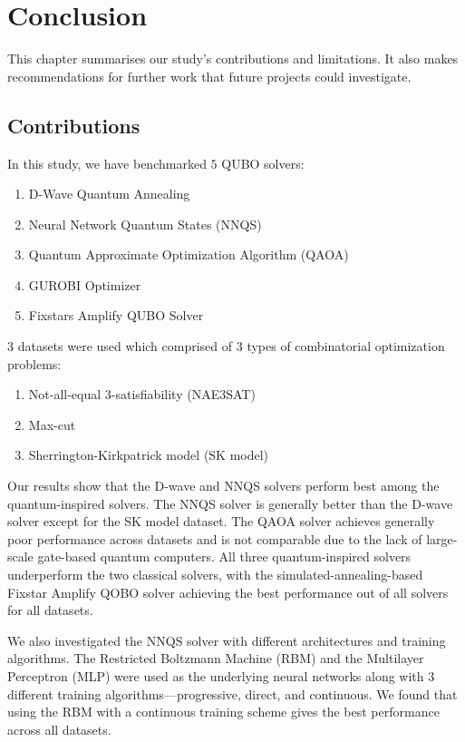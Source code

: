 \chapter{Conclusion}

This chapter summarises our study's contributions and limitations. It also makes recommendations for further work that future projects could investigate.

\section{Contributions}
In this study, we have benchmarked $5$ QUBO solvers:
\begin{enumerate}
    \item D-Wave Quantum Annealing
    \item Neural Network Quantum States (NNQS)
    \item Quantum Approximate Optimization Algorithm (QAOA)
    \item GUROBI Optimizer
    \item Fixstars Amplify QUBO Solver
\end{enumerate}
$3$ datasets were used which comprised of $3$ types of combinatorial optimization problems:
\begin{enumerate}
    \item Not-all-equal 3-satisfiability (NAE3SAT)
    \item Max-cut
    \item Sherrington-Kirkpatrick model (SK model)
\end{enumerate}
Our results show that the D-wave and NNQS solvers perform best among the quantum-inspired solvers. The NNQS solver is generally better than the D-wave solver except for the SK model dataset. The QAOA solver achieves generally poor performance across datasets and is not comparable due to the lack of large-scale gate-based quantum computers. All three quantum-inspired solvers underperform the two classical solvers, with the simulated-annealing-based Fixstar Amplify QOBO solver achieving the best performance out of all solvers for all datasets.

We also investigated the NNQS solver with different architectures and training algorithms. The Restricted Boltzmann Machine (RBM) and the Multilayer Perceptron (MLP) were used as the underlying neural networks along with $3$ different training algorithms---progressive, direct, and continuous. We found that using the RBM with a continuous training scheme gives the best performance across all datasets.


